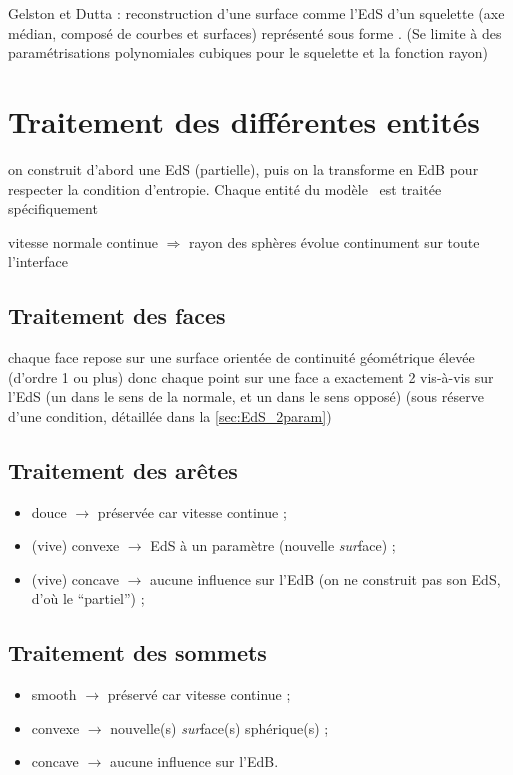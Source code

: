 Gelston et Dutta \cite{gelston1995} : reconstruction d'une surface comme l'EdS d'un squelette (axe médian, composé de courbes et surfaces) représenté sous forme \brep. (Se limite à des paramétrisations polynomiales cubiques pour le squelette et la fonction rayon)

\section{Traitement des différentes entités \brep}
on construit d'abord une EdS (partielle), puis on la transforme en EdB pour respecter la condition d'entropie. Chaque entité du modèle \brep\ est traitée spécifiquement

vitesse normale continue $\Rightarrow$ rayon des sphères évolue continument 
sur toute l'interface
\subsection{Traitement des faces}
chaque face repose sur une surface orientée de continuité géométrique élevée (d'ordre 1 ou plus) donc chaque point sur une face a exactement 2 vis-à-vis sur l'EdS (un dans le sens de la normale, et un dans le sens opposé) (sous réserve d'une condition, détaillée dans la \autoref{sec:EdS_2param})


\subsection{Traitement des arêtes}
\begin{itemize}
	\item douce $\to$ préservée car vitesse continue ;
	\item (vive) convexe $\to$ EdS à un paramètre (nouvelle \textit{sur}face) ;
	\item (vive) concave $\to$ aucune influence sur l'EdB (on ne construit pas son EdS, d'où le ``partiel'') ;
\end{itemize}

\subsection{Traitement des sommets}
\begin{itemize}
	\item smooth $\to$ préservé car vitesse continue ;
	\item convexe $\to$ nouvelle(s) \textit{sur}face(s) sphérique(s) ;
	\item concave $\to$ aucune influence sur l'EdB.
\end{itemize}


